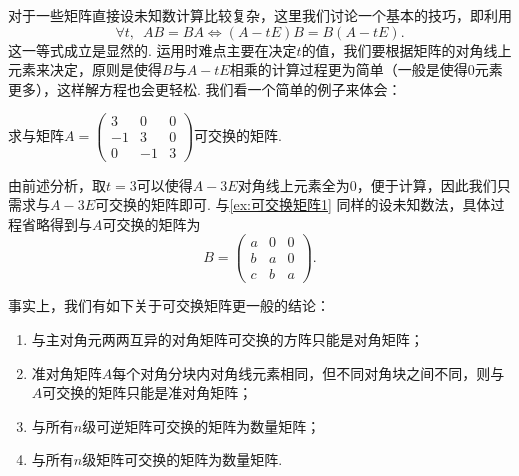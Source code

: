 对于一些矩阵直接设未知数计算比较复杂，这里我们讨论一个基本的技巧，即利用
\[\forall t,\enspace AB=BA \iff (A-tE)B=B(A-tE).\]
这一等式成立是显然的. 运用时难点主要在决定$t$的值，我们要根据矩阵的对角线上元素来决定，原则是使得$B$与$A-tE$相乘的计算过程更为简单（一般是使得0元素更多），这样解方程也会更轻松. 我们看一个简单的例子来体会：
\begin{example}{}{}
    求与矩阵$A=\begin{pmatrix}
            3  & 0  & 0 \\
            -1 & 3  & 0 \\
            0  & -1 & 3
        \end{pmatrix}$可交换的矩阵.
\end{example}

\begin{solution}
    由前述分析，取$t=3$可以使得$A-3E$对角线上元素全为0，便于计算，因此我们只需求与$A-3E$可交换的矩阵即可. 与\autoref{ex:可交换矩阵1} 同样的设未知数法，具体过程省略得到与$A$可交换的矩阵为
    \[B=\begin{pmatrix}
            a & 0 & 0 \\
            b & a & 0 \\
            c & b & a
        \end{pmatrix}.\]
\end{solution}

事实上，我们有如下关于可交换矩阵更一般的结论：
\begin{theorem}{}{}
    \begin{enumerate}
        \item 与主对角元两两互异的对角矩阵可交换的方阵只能是对角矩阵；

        \item 准对角矩阵$A$每个对角分块内对角线元素相同，但不同对角块之间不同，则与$A$可交换的矩阵只能是准对角矩阵；

        \item 与所有$n$级可逆矩阵可交换的矩阵为数量矩阵；

        \item 与所有$n$级矩阵可交换的矩阵为数量矩阵.
    \end{enumerate}
\end{theorem}

